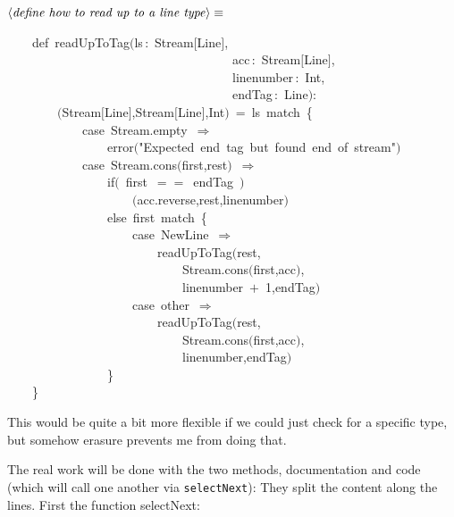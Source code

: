 \documentclass[a4paper,12pt]{article}
\begin{document}
$\left<\mbox{\emph{define how to read up to a line type}}\right>\equiv$
\begin{program}~~~~{\vem def}~readUpToTag$($ls\,{\rm :}~Stream$[$Line$]$,
\\~~~~~~~~~~~~~~~~~~~~~~~~~~~~~~~~~~~~acc\,{\rm :}~Stream$[$Line$]$,
\\~~~~~~~~~~~~~~~~~~~~~~~~~~~~~~~~~~~~linenumber\,{\rm :}~Int,
\\~~~~~~~~~~~~~~~~~~~~~~~~~~~~~~~~~~~~endTag\,{\rm :}~Line$)${\rm :}
\\~~~~~~~~$($Stream$[$Line$]$,Stream$[$Line$]$,Int$)$~=~ls~{\vem match}~{\small\{}
\\~~~~~~~~~~~~{\vem case}~Stream.empty~$\Rightarrow$
\\~~~~~~~~~~~~~~~~error$($"Expected~end~tag~but~found~end~of~stream"$)$
\\~~~~~~~~~~~~{\vem case}~Stream.cons$($first,rest$)$~$\Rightarrow$
\\~~~~~~~~~~~~~~~~{\vem if}$($~first~$==$~endTag~$)$
\\~~~~~~~~~~~~~~~~~~~~$($acc.reverse,rest,linenumber$)$
\\~~~~~~~~~~~~~~~~{\vem else}~first~{\vem match}~{\small\{}
\\~~~~~~~~~~~~~~~~~~~~{\vem case}~NewLine~$\Rightarrow$
\\~~~~~~~~~~~~~~~~~~~~~~~~readUpToTag$($rest,
\\~~~~~~~~~~~~~~~~~~~~~~~~~~~~Stream.cons$($first,acc$)$,
\\~~~~~~~~~~~~~~~~~~~~~~~~~~~~linenumber~$+$~1,endTag$)$
\\~~~~~~~~~~~~~~~~~~~~{\vem case}~other~$\Rightarrow$
\\~~~~~~~~~~~~~~~~~~~~~~~~readUpToTag$($rest,
\\~~~~~~~~~~~~~~~~~~~~~~~~~~~~Stream.cons$($first,acc$)$,
\\~~~~~~~~~~~~~~~~~~~~~~~~~~~~linenumber,endTag$)$
\\~~~~~~~~~~~~~~~~{\small\}}
\\~~~~{\small\}}
\\[0.5em]\end{program}



This would be quite a bit more flexible if we could just check for
a specific type, but somehow erasure prevents me from doing that.

The real work will be done with the two methods, documentation and
code (which will call one another via \texttt{selectNext}): They split the
content along the lines. First the function selectNext:
\end{document}
